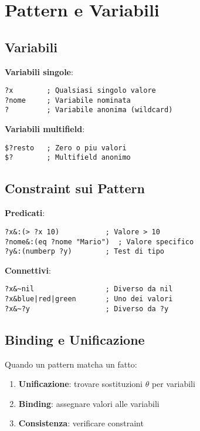 \section{Pattern e Variabili}

\subsection{Variabili}

\textbf{Variabili singole}:
\begin{lstlisting}[language=CLIPS]
?x        ; Qualsiasi singolo valore
?nome     ; Variabile nominata
?         ; Variabile anonima (wildcard)
\end{lstlisting}

\textbf{Variabili multifield}:
\begin{lstlisting}[language=CLIPS]
$?resto   ; Zero o piu valori
$?        ; Multifield anonimo
\end{lstlisting}

\subsection{Constraint sui Pattern}

\textbf{Predicati}:
\begin{lstlisting}[language=CLIPS]
?x&:(> ?x 10)           ; Valore > 10
?nome&:(eq ?nome "Mario")  ; Valore specifico
?y&:(numberp ?y)        ; Test di tipo
\end{lstlisting}

\textbf{Connettivi}:
\begin{lstlisting}[language=CLIPS]
?x&~nil                 ; Diverso da nil
?x&blue|red|green       ; Uno dei valori
?x&~?y                  ; Diverso da ?y
\end{lstlisting}

\subsection{Binding e Unificazione}

Quando un pattern matcha un fatto:

\begin{enumerate}
\item \textbf{Unificazione}: trovare sostituzioni $\theta$ per variabili
\item \textbf{Binding}: assegnare valori alle variabili
\item \textbf{Consistenza}: verificare constraint
\end{enumerate}

